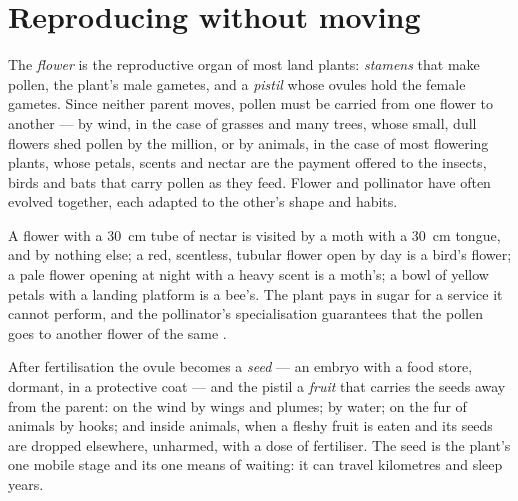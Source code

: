 \section{Reproducing without moving}

\begin{proposition}\label{prop:g12:plant-rooted-life:flowers}
The \emph{flower} is the reproductive organ of most land plants:
\emph{stamens} that make pollen, the plant's male gametes, and a
\emph{pistil} whose ovules hold the female gametes. Since neither
parent moves, pollen must be carried from one flower to another ---
by wind, in the case of grasses and many trees, whose small, dull
flowers shed pollen by the million, or by animals, in the case of most
flowering plants, whose petals, scents and nectar are the payment
offered to the insects, birds and bats that carry pollen as they feed.
Flower and pollinator have often evolved together, each adapted to the
other's shape and habits.
\end{proposition}
\admitted

\begin{example}\label{ex:g12:plant-rooted-life:match}
A flower with a \qty{30}{cm} tube of nectar is visited by a moth with a
\qty{30}{cm} tongue, and by nothing else; a red, scentless, tubular
flower open by day is a bird's flower; a pale flower opening at night
with a heavy scent is a moth's; a bowl of yellow petals with a landing
platform is a bee's. The plant pays in sugar for a service it cannot
perform, and the pollinator's specialisation guarantees that the
pollen goes to another flower of the same .
\end{example}

\begin{proposition}\label{prop:g12:plant-rooted-life:dispersal}
After fertilisation the ovule becomes a \emph{seed} --- an embryo with
a food store, dormant, in a protective coat --- and the pistil a
\emph{fruit} that carries the seeds away from the parent: on the wind
by wings and plumes; by water; on the fur of animals by hooks; and
inside animals, when a fleshy fruit is eaten and its seeds are dropped
elsewhere, unharmed, with a dose of fertiliser. The seed is the plant's
one mobile stage and its one means of waiting: it can travel
kilometres and sleep years.
\end{proposition}
\admitted

